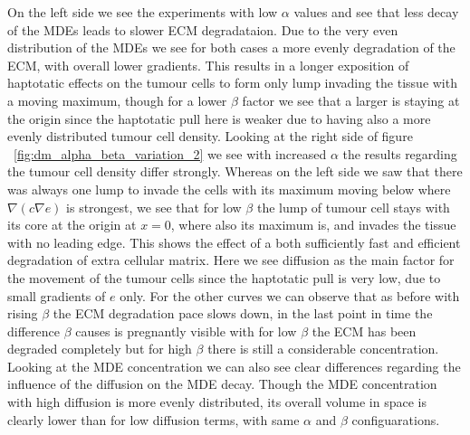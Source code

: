 On the left side we see the experiments with low $\alpha$ values and see that less decay of the MDEs leads to slower ECM degradataion. Due to the very even distribution of the MDEs we see for both cases a more evenly degradation of the ECM, with overall lower gradients. This results in a longer exposition of haptotatic effects on the tumour cells to form only lump invading the tissue with a moving maximum, though for a lower $\beta$ factor we see that a larger is staying at the origin since the haptotatic pull here is weaker due to having also a more evenly distributed tumour cell density.\newline 
Looking at the right side of figure ~\ref{fig:dm_alpha_beta_variation_2} we see with increased $\alpha$ the results regarding the tumour cell density differ strongly. Whereas on the left side we saw that there was always one lump to invade the cells with its maximum moving below where $\nabla(c\nabla e)$ is strongest, we see that for low $\beta$ the lump of tumour cell stays with its core at the origin at $x=0$, where also its maximum is, and invades the tissue with no leading edge. This shows the effect of a both sufficiently fast and efficient degradation of extra cellular matrix. Here we see diffusion as the main factor for the movement of the tumour cells since the haptotatic pull is very low, due to small gradients of $e$ only. For the other curves we can observe that as before with rising $\beta$ the ECM degradation pace slows down, in the last point in time the difference $\beta$ causes is pregnantly visible with for low $\beta$ the ECM has been degraded completely but for high $\beta$ there is still a considerable concentration. Looking at the MDE concentration we can also see clear differences regarding the influence of the diffusion on the MDE decay. Though the MDE concentration with high diffusion is more evenly distributed, its overall volume in space is clearly lower than for low diffusion terms, with same $\alpha$ and $\beta$ configuarations.



